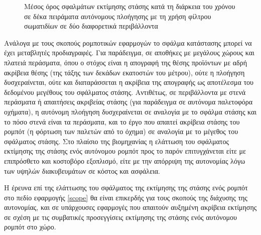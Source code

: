 \begin{figure}[h]\centering\vspace{2.5cm}
   \begin{subfigure}{0.49\linewidth}\centering
     
   \end{subfigure}
   \begin{subfigure}{0.49\linewidth} \centering
     
   \end{subfigure}
   \vspace{0.75cm}
\caption{\small Μέσος όρος σφαλμάτων εκτίμησης στάσης κατά τη διάρκεια του
         χρόνου σε δέκα πειράματα αυτόνομους πλοήγησης με τη χρήση φίλτρου
         σωματιδίων σε δύο διαφορετικά περιβάλλοντα}
\label{fig:02_01_05}
\end{figure}

Ανάλογα με τους σκοπούς ρομποτικών εφαρμογών το σφάλμα κατάστασης μπορεί να
έχει μεταβλητές προδιαγραφές. Για παράδειγμα, σε αποθήκες με μεγάλους χώρους και
πλατειά περάσματα, όπου ο στόχος είναι η απογραφή της θέσης προϊόντων με αδρή
ακρίβεια θέσης (της τάξης των δεκάδων εκατοστών του μέτρου), ούτε η πλοήγηση
δυσχεραίνεται, ούτε και διαταράσσεται η ακρίβεια της απογραφής ως αποτέλεσμα
του δεδομένου μεγέθους του σφάλματος στάσης. Αντιθέτως, σε περιβάλλοντα με
στενά περάσματα ή απαιτήσεις ακριβείας στάσης (για παράδειγμα σε αυτόνομα
παλετοφόρα οχήματα), η αυτόνομη πλοήγηση δυσχεραίνεται σε αναλογία με το σφάλμα
στάσης και το πόσο στενά είναι τα περάσματα, και το έργο που απαιτεί ακρίβεια
στάσης του ρομπότ (η φόρτωση των παλετών από το όχημα) σε αναλογία με το
μέγεθος του σφάλματος στάσης. Στο πλαίσιο της βιομηχανίας η ελάττωση του
σφάλματος εκτίμησης της στάσης ενός αυτόνομου ρομπότ προς το παρόν
επιτυγχάνεται είτε με επιπρόσθετο και κοστοβόρο εξοπλισμό, είτε με την απόρριψη
της αυτονομίας λόγω των υψηλών διακυβευμάτων σε κόστος και ασφάλεια.

Η έρευνα επί της ελάττωσης του σφάλματος της εκτίμησης της στάσης ενός ρομπότ
στο πεδίο εφαρμογής \ref{scope} θα είναι επικερδής για τους σκοπούς της
διάχυσης της αυτονομίας, και σε υπάρχουσες εφαρμογές που απαιτούν αυξημένη
ακρίβεια εκτίμησης σε σχέση με τις συμβατικές προσεγγίσεις εκτίμησης της στάσης
ενός αυτόνομου ρομπότ στο χώρο.
